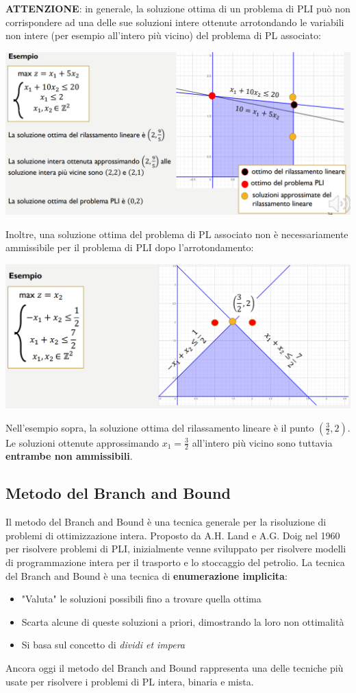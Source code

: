 \documentclass[12pt]{article}
\begin{document}
\textbf{ATTENZIONE}: in generale, la soluzione ottima di un problema di PLI può non corrispondere ad una delle sue soluzioni intere ottenute arrotondando le variabili non intere
(per esempio all'intero più vicino) del problema di PL associato:
\begin{center}
    \includegraphics[width = 1\linewidth]{Images/64.png}
\end{center}
Inoltre, una soluzione ottima del problema di PL associato non è necessariamente ammissibile per il problema di PLI dopo l'arrotondamento:
\begin{center}
    \includegraphics[width = 1\linewidth]{Images/63.png}
\end{center}
Nell'esempio sopra, la soluzione ottima del rilassamento lineare è il punto $(\frac{3}{2}, 2)$. Le soluzioni ottenute approssimando $x_1 = \frac{3}{2}$ all'intero più vicino
sono tuttavia \textbf{entrambe non ammissibili}.
\subsection{Metodo del Branch and Bound}
Il metodo del Branch and Bound è una tecnica generale per la risoluzione di problemi di ottimizzazione intera.
Proposto da A.H. Land e A.G. Doig nel 1960 per risolvere problemi di PLI, inizialmente venne sviluppato per risolvere
modelli di programmazione intera per il trasporto e lo stoccaggio del petrolio.
La tecnica del Branch and Bound è una tecnica di \textbf{enumerazione implicita}:
\begin{itemize}
    \item "Valuta" le soluzioni possibili fino a trovare quella ottima
    \item Scarta alcune di queste soluzioni a priori, dimostrando la loro non ottimalità 
    \item Si basa sul concetto di \textit{dividi et impera}
\end{itemize}
Ancora oggi il metodo del Branch and Bound rappresenta una delle tecniche più usate per risolvere i problemi di PL intera, binaria e mista.
\end{document}
